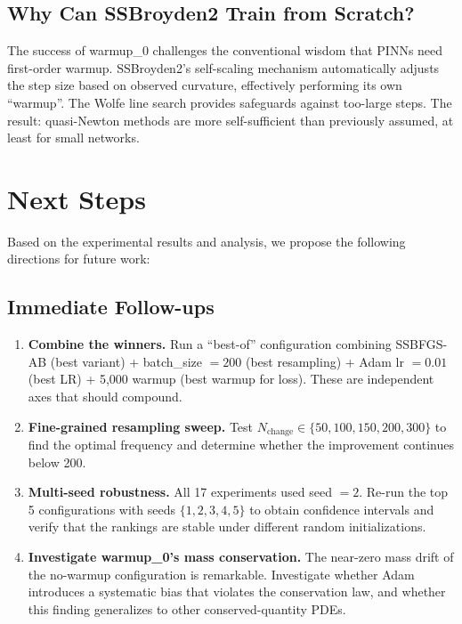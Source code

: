 \documentclass[11pt,a4paper]{article}
\begin{document}
\subsection{Why Can SSBroyden2 Train from Scratch?}

The success of warmup\_0 challenges the conventional wisdom that
PINNs need first-order warmup.  SSBroyden2's self-scaling mechanism
automatically adjusts the step size based on observed curvature,
effectively performing its own ``warmup''.  The Wolfe line search
provides safeguards against too-large steps.  The result: quasi-Newton
methods are more self-sufficient than previously assumed, at least
for small networks.


\section{Next Steps}
\label{sec:next}

Based on the experimental results and analysis, we propose the following
directions for future work:

\subsection{Immediate Follow-ups}

\begin{enumerate}
  \item \textbf{Combine the winners.}  Run a ``best-of'' configuration
        combining SSBFGS-AB (best variant) + batch\_size $= 200$ (best
        resampling) + Adam lr $= 0.01$ (best LR) + 5,000 warmup (best
        warmup for loss).  These are independent axes that should compound.

  \item \textbf{Fine-grained resampling sweep.}  Test $N_{\text{change}} \in
        \{50, 100, 150, 200, 300\}$ to find the optimal frequency and
        determine whether the improvement continues below 200.

  \item \textbf{Multi-seed robustness.}  All 17 experiments used seed $= 2$.
        Re-run the top 5 configurations with seeds $\{1, 2, 3, 4, 5\}$ to
        obtain confidence intervals and verify that the rankings are stable
        under different random initializations.

  \item \textbf{Investigate warmup\_0's mass conservation.}  The near-zero
        mass drift of the no-warmup configuration is remarkable.
        Investigate whether Adam introduces a systematic bias that violates
        the conservation law, and whether this finding generalizes to other
        conserved-quantity PDEs.
\end{enumerate}
\end{document}

